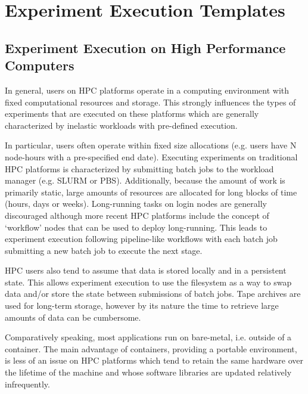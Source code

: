 \documentclass[utf8]{FrontiersinVancouver} %
\begin{document}
\section{Experiment Execution Templates}

\subsection{Experiment Execution on High Performance Computers}
In general, users on HPC platforms operate in a computing environment with
fixed computational resources and storage. This strongly influences the types
of experiments that are executed on these platforms which are generally
characterized by inelastic workloads with pre-defined execution.

In particular, users often operate within fixed size allocations (e.g. users
have N node-hours with a pre-specified end date). Executing experiments on
traditional HPC platforms is characterized by submitting batch jobs to the
workload manager (e.g. SLURM or PBS). Additionally, because the amount of work
is primarily static, large amounts of resources are allocated for long blocks of
time (hours, days or weeks). Long-running tasks on login nodes are generally
discouraged although more recent HPC platforms include the concept of `workflow'
nodes that can be used to deploy long-running. This leads to experiment
execution following pipeline-like workflows with each batch job submitting a new
batch job to execute the next stage.

HPC users also tend to assume that data is stored locally and in a persistent
state. This allows experiment execution to use the filesystem as a way to swap
data and/or store the state between submissions of batch jobs. Tape archives are
used for long-term storage, however by its nature the time to retrieve large
amounts of data can be cumbersome.

Comparatively speaking, most applications run on bare-metal, i.e. outside of a
container. The main advantage of containers, providing a portable environment,
is less of an issue on HPC platforms which tend to retain the same hardware over
the lifetime of the machine and whose software libraries are updated relatively
infrequently.

\end{document}
